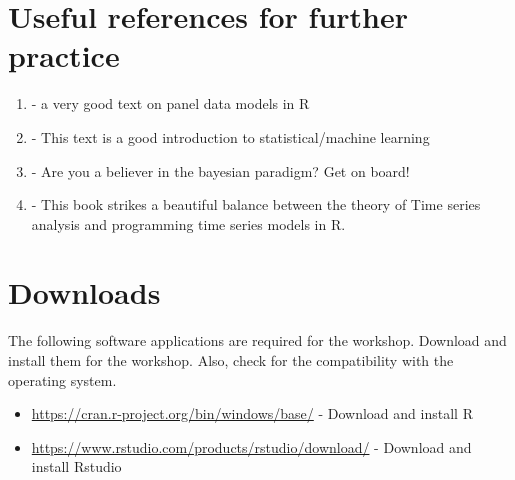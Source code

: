 \documentclass[12pt,a4paper]{article}
\begin{document}
	\section*{Useful references for further practice}
	\begin{enumerate}[label=(\alph*)]
		\item \cite{croissant2018panel} - a very good text on panel data models in R
		\item \cite{james2013introduction} - This text is a good introduction to statistical/machine learning
		\item  \cite{albert2009bayesian} - Are you a believer in the bayesian paradigm? Get on board!
		\item \cite{shumway2006time} - This book strikes a beautiful balance between the theory of Time series analysis and programming time series models in R.
	\end{enumerate}
	
	\section*{Downloads}
	The following software applications are required for the workshop. Download and install them for the workshop. Also, check for the compatibility with the operating system.
	\begin{itemize}
		\item \url{https://cran.r-project.org/bin/windows/base/} - Download and install R
		\item \url{https://www.rstudio.com/products/rstudio/download/} - Download and install Rstudio
	\end{itemize}
\printbibliography
\end{document}
